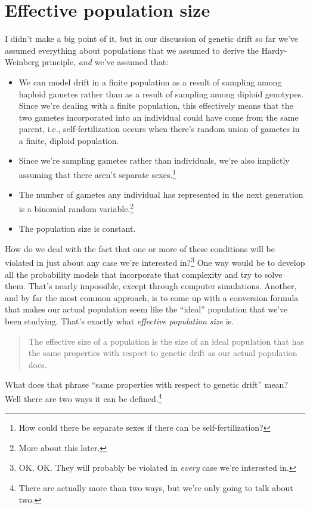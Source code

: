 \documentclass[12pt]{article}
\begin{document}
\section*{Effective population size}

I didn't make a big point of it, but in our discussion of genetic
drift so far we've assumed everything about populations that we
assumed to derive the Hardy-Weinberg principle, {\it and\/} we've
assumed that:

\begin{itemize}

\item We can model drift in a finite population as a result of
sampling among haploid gametes rather than as a result of sampling
among diploid genotypes. Since we're dealing with a finite population,
this effectively means that the two gametes incorporated into an
individual could have come from the same parent, i.e.,
self-fertilization occurs when there's random union of gametes in a
finite, diploid population.

\item Since we're sampling gametes rather than individuals, we're also
  implictly assuming that there aren't separate sexes.\footnote{How
    could there be separate sexes if there can be self-fertilization?}

\item The number of gametes any individual has represented in the next
  generation is a binomial random variable.\footnote{More about this
    later.}

\item The population size is constant.

\end{itemize}

How do we deal with the fact that one or more of these conditions will
be violated in just about any case we're interested in?\footnote{OK,
  OK. They will probably be violated in {\it every\/} case we're
  interested in.} One way would be to develop all the probability
models that incorporate that complexity and try to solve them. That's
nearly impossible, except through computer simulations. Another, and
by far the most common approach, is to come up with a conversion
formula that makes our actual population seem like the ``ideal''
population that we've been studying. That's exactly what {\it
  effective population size\/} is.
\begin{quote}
The effective size of a population is the size of an ideal population
that has the same properties with respect to genetic drift as our
actual population does.
\end{quote}
What does that phrase ``same properties with respect to genetic
drift'' mean? Well there are two ways it can be
defined.\footnote{There are actually more than two ways, but we're
  only going to talk about two.}
\end{document}
